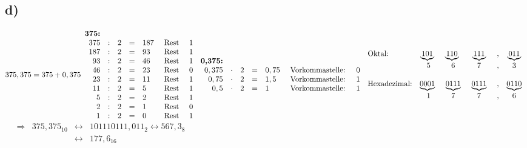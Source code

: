 \documentclass[a4paper]{scrartcl}
\begin{document}
	\subsection{d)}
		\(	
		375,375=375+0,375\\ \\
		\begin{array}{rclclcc}
			\textbf{375:}\\			
			375 &:& 2 &=& 187 &\text{ Rest } &1 \\
			187 &:& 2 &=& 93  &\text{ Rest } &1 \\
			93  &:& 2 &=& 46  &\text{ Rest } &1 \\
			46  &:& 2 &=& 23  &\text{ Rest } &0 \\
			23  &:& 2 &=& 11  &\text{ Rest } &1 \\
			11  &:& 2 &=& 5   &\text{ Rest } &1 \\
			5   &:& 2 &=& 2   &\text{ Rest } &1 \\
			2  &:& 2  &=& 1   &\text{ Rest } &0 \\
			1  &:& 2  &=& 0   &\text{ Rest } &1 \\
		\end{array} \\ \\ \\
		\begin{array}{rclclcc}	
			\textbf{0,375:}\\
			0,375 &\cdot & 2 &=& 0,75 & \text{ Vorkommastelle: } &0 \\
			0,75  &\cdot & 2 &=& 1,5  & \text{ Vorkommastelle: } &1 \\
			0,5   &\cdot & 2 &=& 1    & \text{ Vorkommastelle: } &1 \\
		\end{array} \\ \\ \\
		\begin{array}{lcccccc}
			\text{Oktal:}&\underbrace{101}\ &\underbrace{110}\ &\underbrace{111}&,&\underbrace{011} \\
				&5&6&7&,& 3\\ \\
			\text{Hexadezimal:}&\underbrace{0001}\ &\underbrace{0111}&\ \underbrace{0111}\ &,& 
			\underbrace{0110}  \\
				&1&7&7&,&6 \\
		\end{array}
		\)
		\(
		\begin{array}{rlcl}
			\quad\Rightarrow & 375,375_{10}&\leftrightarrow & 101110111,011_2\leftrightarrow 567,3_8 \\ 
				&&\leftrightarrow & 177,6_{16} \\
		\end{array}		
		\)\\ \\ \\
	
\end{document}
